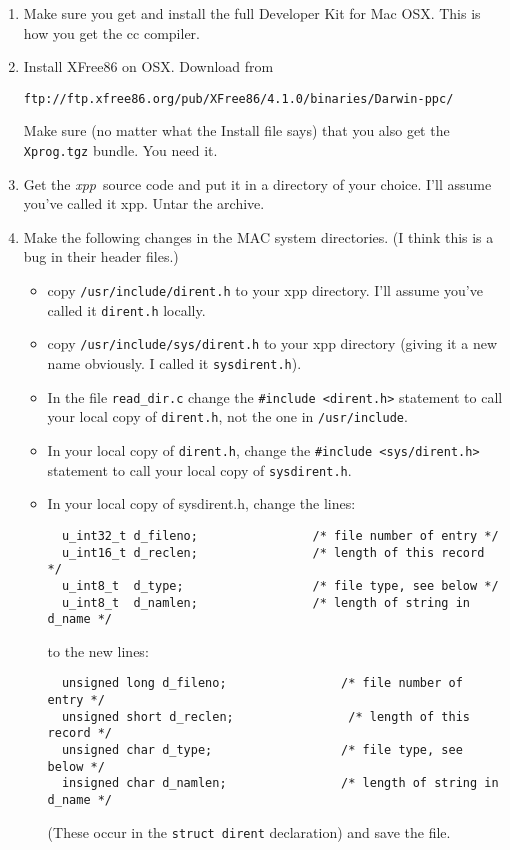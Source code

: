\documentclass{article}
\newcommand{\xpp}{{\sl xpp\, }}
\begin{document}
\begin{enumerate}
\item Make sure you get and install the full Developer Kit for Mac OSX.
This is how you get the cc compiler.

\item  Install XFree86 on OSX. Download from
\begin{verbatim}
ftp://ftp.xfree86.org/pub/XFree86/4.1.0/binaries/Darwin-ppc/
\end{verbatim}

Make sure (no matter what the Install file says) that you also get
the {\tt Xprog.tgz}  bundle. You need it.

\item Get the \xpp source code  and put it in a directory of your choice.
I'll assume you've called it xpp. Untar the archive.

\item Make the following changes in the MAC system directories. (I
think this is a bug in their header files.) 
\begin{itemize}
  \item copy {\tt /usr/include/dirent.h}  to your xpp directory. I'll assume
you've called it {\tt dirent.h} locally.

     \item copy {\tt /usr/include/sys/dirent.h} to your xpp directory
     (giving it a new name obviously. I called it {\tt sysdirent.h}).

     \item In the file {\tt read\_dir.c} change the {\tt \#include <dirent.h>}
statement to call your local copy of {\tt dirent.h}, not the one in
{\tt /usr/include}.

     \item In your local copy of {\tt dirent.h}, change the {\tt \#include
<sys/dirent.h>}   statement to call your local copy of {\tt sysdirent.h}.

     \item In your local copy of sysdirent.h, change the lines:
\begin{verbatim}
  u_int32_t d_fileno;                /* file number of entry */
  u_int16_t d_reclen;                /* length of this record */
  u_int8_t  d_type;                  /* file type, see below */
  u_int8_t  d_namlen;                /* length of string in d_name */
\end{verbatim}
to the new lines:
\begin{verbatim}
  unsigned long d_fileno;                /* file number of entry */
  unsigned short d_reclen;                /* length of this record */
  unsigned char d_type;                  /* file type, see below */
  insigned char d_namlen;                /* length of string in d_name */
\end{verbatim}
(These occur in the {\tt struct dirent}  declaration)
and save the file.
\end{itemize}



\end{enumerate}
\end{document}
